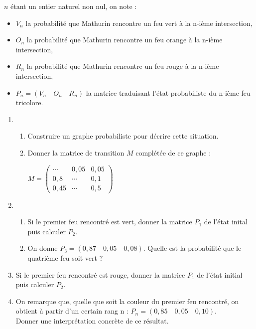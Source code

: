 $n$ étant un entier naturel non nul, on note :
\begin{itemize}
     \item
     $V_{n}$ la probabilité que Mathurin rencontre un feu vert à la n-ième intersection,
     \item
     $O_{n}$ la probabilité que Mathurin rencontre un feu orange à la n-ième intersection,
     \item
     $R_{n}$ la probabilité que Mathurin rencontre un feu rouge à la n-ième intersection,
     \item
     $P_{n}=\left(V_{n} \quad O_{n} \quad R_{n}\right)$ la matrice traduisant l'état probabiliste du n-ième feu tricolore.
\end{itemize}
\begin{enumerate}
     \item
     \begin{enumerate}[label=\alph*.]
          \item
          Construire un graphe probabiliste pour décrire cette situation.
          \item
          Donner la matrice de transition $M$ complétée de ce graphe :
          \par
          $M = \begin{pmatrix}  \cdots & 0,05 & 0,05 \\ 0,8 & \cdots & 0,1 \\ 0,45 & \cdots & 0,5 \end{pmatrix}$
     \end{enumerate}
     \item
     \begin{enumerate}[label=\alph*.]
          \item
          Si le premier feu rencontré est vert, donner la matrice $P_{1}$ de l'état inital puis calculer $P_{2}$.
          \item
          On donne $P_{3}=\left(0,87 \quad 0,05 \quad 0,08\right)$. Quelle est la probabilité que le quatrième feu soit vert ?
     \end{enumerate}
     \item
     Si le premier feu rencontré est rouge, donner la matrice $P_{1}$ de l'état initial puis calculer $P_{2}$.
     \item
     On remarque que, quelle que soit la couleur du premier feu rencontré, on obtient à partir d'un certain rang n : $P_{n}=\left(0,85 \quad 0,05 \quad 0,10\right)$.
\\
     Donner une interprétation concrète de ce résultat.
\end{enumerate}
